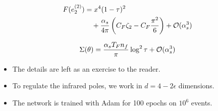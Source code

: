 \begin{align}
  F(e_2^{(2)}) &= {x}^{4} (1 - \tau)^{2} \nonumber \\
  &\quad + \frac{\alpha_s}{4\pi} \left( C_F \zeta_{2} - C_F \frac{\pi^2}{6} \right) + \mathcal{O}(\alpha_s^3) \label{eq:2}
\end{align}

\begin{equation}
  \Sigma(\theta) = \frac{\alpha_s T_F n_f}{\pi} \log^2 \tau + \mathcal{O}(\alpha_s^{3})
  \label{eq:3}
\end{equation}

\begin{itemize}
  \item The details are left as an exercise to the reader.
  \item To regulate the infrared poles, we work in $d = 4 - 2\epsilon$ dimensions.
  \item The network is trained with Adam for 100 epochs on $10^6$ events.
\end{itemize}

